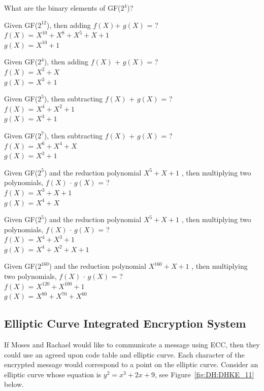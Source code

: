 \begin{exer}
What are the binary elements of GF($2^4$)?
\end{exer}
\begin{exer}
Given GF($2^{12}$), then adding $f(X)$+ $g(X)$ = ?
        \\ $f(X)$ = $X^{10} + X^8 + X^5 + X + 1$
        \\ $g(X)$ = $X^{10} + 1$
\end{exer}
\begin{exer}
Given GF($2^4$), then adding $f(X)$ + $g(X)$ = ?
        \\ $f(X)$ = $X^{2} + X $
        \\ $g(X)$ = $X^{3} + 1$
\end{exer}
\begin{exer}
Given GF($2^5$), then subtracting $f(X)$ + $g(X)$ = ?
        \\ $f(X)$ = $X^{4} + X^2 + 1 $
        \\ $g(X)$ = $X^{3} + 1$
\end{exer}
\begin{exer}
Given GF($2^7$), then subtracting $f(X)$ + $g(X)$ = ?
        \\ $f(X)$ = $X^{6} + X^4 + X $
        \\ $g(X)$ = $X^{3} + 1$
\end{exer}
\begin{exer}
Given GF($2^5$) and the reduction polynomial $X^5 + X + 1$ , then multiplying two polynomials, $f(X)$ $\cdot$ $g(X)$ = ?
        \\ $f(X)$ = $X^{3} + X + 1 $
        \\ $g(X)$ = $X^{4} + X$
\end{exer}
\begin{exer}
Given GF($2^5$) and the reduction polynomial $X^5 + X + 1$ , then multiplying two polynomials, $f(X)$ $\cdot$ $g(X)$ = ?
        \\ $f(X)$ = $X^{4} + X^3 + 1 $
        \\ $g(X)$ = $X^{4} + X^2 + X + 1$
\end{exer}
\begin{exer}
Given GF($2^{160}$) and the reduction polynomial $X^{160} + X + 1$ , then multiplying two polynomials, $f(X)$ $\cdot$ $g(X)$ = ?
        \\ $f(X)$ = $X^{120} + X^{100} + 1 $
        \\ $g(X)$ = $X^{80} + X^{70} + X^{60}$
\end{exer}

\subsection{Elliptic Curve Integrated Encryption System} 
If Moses and Rachael would like to communicate a message using ECC, then they could use an agreed upon code table and elliptic curve.  Each character of the encrypted message would correspond to a point on the elliptic curve. Consider an elliptic curve whose equation is $y^2 = x^3 + 2x + 9$, see Figure~\ref{fig:DH:DHKE_11} below.

